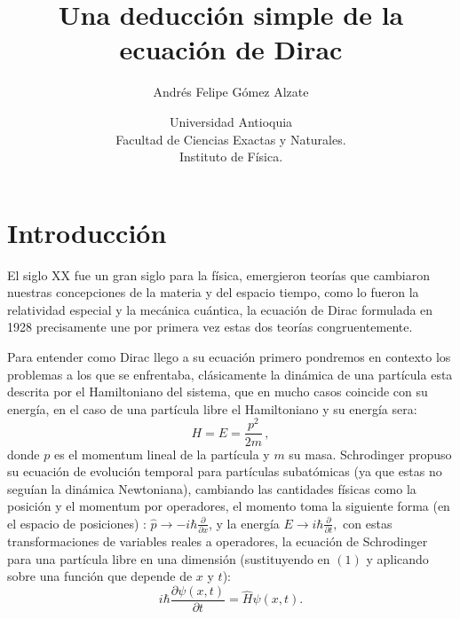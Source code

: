 \documentclass[twocolumn]{article}
\title{Una deducción simple de la ecuación de Dirac}
\author{Andrés Felipe Gómez Alzate }
\date{Universidad Antioquia\\ Facultad de Ciencias Exactas y Naturales.\\ Instituto de Física.}
\begin{document}

\section{Introducción}
El siglo XX fue un gran siglo para la física, emergieron teorías que cambiaron nuestras concepciones de la materia y del espacio tiempo, como lo fueron la relatividad especial y la mecánica cuántica, la ecuación de Dirac formulada en 1928 precisamente une por primera vez estas dos teorías congruentemente.

Para entender como Dirac llego a su ecuación primero pondremos en contexto los problemas a los que se enfrentaba, clásicamente la dinámica de una partícula esta descrita por el Hamiltoniano del sistema, que en mucho casos coincide con su energía, en el caso de una partícula libre el Hamiltoniano y su energía sera:
\begin{equation}
    H=E=\frac{p^2}{2m} \,,
\end{equation}
donde $p$ es el momentum lineal de la partícula y $m$ su masa. Schrodinger propuso su ecuación de evolución temporal para partículas subatómicas (ya que estas no seguían la dinámica Newtoniana), cambiando las cantidades físicas como la posición y el momentum por operadores, el momento toma la siguiente forma (en el espacio de posiciones) : $\hat{p} \rightarrow -i\hbar \frac{\partial}{\partial x}$, y la energía $E \rightarrow i\hbar\frac{\partial}{\partial t},$ con estas transformaciones de variables reales a operadores, la  ecuación de Schrodinger para una partícula libre en una dimensión (sustituyendo en $(1)$ y aplicando sobre una función que depende de $x$ y $t$):
\begin{equation}
    i\hbar \frac{\partial\psi(x,t)}{\partial t}=\hat{H}\psi(x,t) .
\end{equation}
\end{document}
